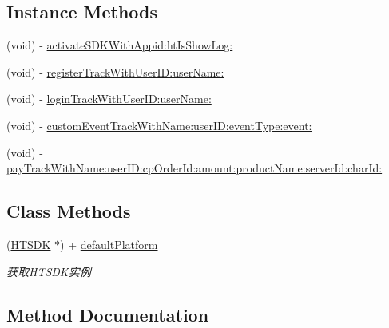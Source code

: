 \subsection*{Instance Methods}
\begin{DoxyCompactItemize}
\item 
(void) -\/ \mbox{\hyperlink{interface_h_t_s_d_k_acaca7e6849ba93603969e53924a61aa3}{activate\+S\+D\+K\+With\+Appid\+:ht\+Is\+Show\+Log\+:}}
\item 
(void) -\/ \mbox{\hyperlink{interface_h_t_s_d_k_aec09138a22bc1c78742d69ba5c3f78a9}{register\+Track\+With\+User\+I\+D\+:user\+Name\+:}}
\item 
(void) -\/ \mbox{\hyperlink{interface_h_t_s_d_k_a4e1a943d25205b90510fd5f31219ef52}{login\+Track\+With\+User\+I\+D\+:user\+Name\+:}}
\item 
(void) -\/ \mbox{\hyperlink{interface_h_t_s_d_k_a9dc6d7fd058584073bfcf843a33c9d08}{custom\+Event\+Track\+With\+Name\+:user\+I\+D\+:event\+Type\+:event\+:}}
\item 
(void) -\/ \mbox{\hyperlink{interface_h_t_s_d_k_af32ca807c891270ff725c1968651efcf}{pay\+Track\+With\+Name\+:user\+I\+D\+:cp\+Order\+Id\+:amount\+:product\+Name\+:server\+Id\+:char\+Id\+:}}
\end{DoxyCompactItemize}
\subsection*{Class Methods}
\begin{DoxyCompactItemize}
\item 
\mbox{\label{interface_h_t_s_d_k_a62ec37d20e82301b152dfb26d8552786}} 
(\mbox{\hyperlink{interface_h_t_s_d_k}{H\+T\+S\+DK}} $\ast$) + \mbox{\hyperlink{interface_h_t_s_d_k_a62ec37d20e82301b152dfb26d8552786}{default\+Platform}}
\begin{DoxyCompactList}\small\item\em 获取\+H\+T\+S\+D\+K实例 \end{DoxyCompactList}\end{DoxyCompactItemize}


\subsection{Method Documentation}
\mbox{\label{interface_h_t_s_d_k_acaca7e6849ba93603969e53924a61aa3}} 
